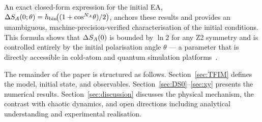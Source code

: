 An exact closed-form expression for the initial EA,
$\Delta S_A(0;\theta) = h_{\rm bin}\!\bigl((1 + \cos^{N_A}\!\theta)/2\bigr)$,
anchors these results and provides an unambiguous, machine-precision-verified
characterisation of the initial conditions.
This formula shows that $\Delta S_A(0)$ is bounded by $\ln 2$ for any Z2 symmetry
and is controlled entirely by the initial polarisation angle $\theta$ — a parameter
that is directly accessible in cold-atom and quantum simulation platforms~\cite{Bloch2008}.

The remainder of the paper is structured as follows.
Section~\ref{sec:TFIM} defines the model, initial state, and observables.
Section~\ref{sec:DS0}--\ref{sec:xy} presents the numerical results.
Section~\ref{sec:discussion} discusses the physical mechanism, the contrast with
chaotic dynamics, and open directions including analytical understanding and
experimental realisation.

